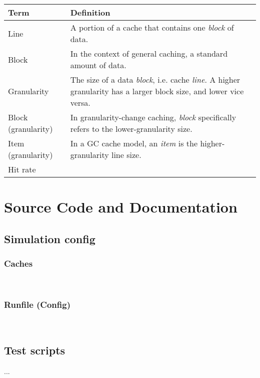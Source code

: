 \documentclass[12pt,twoside]{reedthesis}
\begin{document}
\def\arraystretch{1.5}
\begin{tabular}{p{1.5in}p{3.8in}}
    \hline
    \textbf{Term}       & \textbf{Definition} \\
    \hline
    Line                & A portion of a cache that contains one \textit{block} of data. \\
    Block               & In the context of general caching, a standard amount of data. \\
    Granularity         & The size of a data \textit{block}, i.e. cache \textit{line}. A higher granularity has a larger block size, and lower vice versa. \\
    Block (granularity) & In granularity-change caching, \textit{block} specifically refers to the lower-granularity size. \\
    Item (granularity)  & In a GC cache model, an \textit{item} is the higher-granularity line size. \\
    Hit rate            &
\end{tabular}

\chapter{Source Code and Documentation}

\section{Simulation config}

\subsection*{Caches}

\;\\

\subsection*{Runfile (Config)}

\;\\

\section{Test scripts}

...

\backmatter %

\nocite{*}
\printbibliography[title=References]
\end{document}
